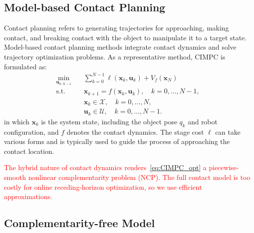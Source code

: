\subsection{Model-based Contact Planning}
\label{preliminaries:contact_planning}

Contact planning refers to generating trajectories for approaching, making contact, and breaking contact with the object to manipulate it to a target state.
Model-based contact planning methods integrate contact dynamics and solve trajectory optimization problems.
As a representative method, CIMPC is formulated as:
\begin{equation}
\begin{aligned}
 \min_{\boldsymbol{u}_{0:N-1}}\quad
 &
 \sum_{k=0}^{N-1}
 \ell(\boldsymbol{x}_k,\boldsymbol{u}_k)
 +
 V_f(\boldsymbol{x}_N)
 \\
 \mathrm{s.t.}\quad
 &
 \boldsymbol{x}_{k+1}
 =
 f(\boldsymbol{x}_k,\boldsymbol{u}_k),
 \quad
 k=0,\ldots,N-1,
 \\
 &
 \boldsymbol{x}_k\in\mathcal{X},
 \quad
 k=0,\ldots,N,
 \\
 &
 \boldsymbol{u}_k\in\mathcal{U},
 \quad
 k=0,\ldots,N-1.
\end{aligned}
\label{eq:CIMPC_opt}
\end{equation}
\noindent in which $\boldsymbol{x}_k$ is the system state, including the object pose $q_k$ and robot configuration, and $f$ denotes the contact dynamics.
The stage cost $\ell$ can take various forms and is typically used to guide the process of approaching the contact location.

\noindent\textcolor{red}{
The hybrid nature of contact dynamics renders~\eqref{eq:CIMPC_opt} a piecewise-smooth nonlinear complementarity problem (NCP).
The full contact model is too costly for online receding-horizon optimization, so we use efficient approximations.
}

\subsection{Complementarity-free Model}
\label{preliminaries:complementarity_free}

